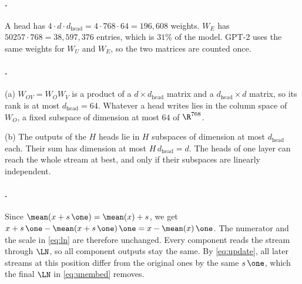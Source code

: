 {\paragraph{.}
A head has $4\cdot d\cdot d_{\mathrm{head}}=4\cdot768\cdot64=196{,}608$ weights. $W_E$ has
$50257\cdot768=38{,}597{,}376$ entries, which is $31\%$ of the model. GPT-2 uses the same weights for $W_U$ and
$W_E$, so the two matrices are counted once.

\paragraph{.}
(a) $W_{OV}=W_OW_V$ is a product of a $d\times d_{\mathrm{head}}$ matrix and a $d_{\mathrm{head}}\times d$ matrix, so its
rank is at most $d_{\mathrm{head}}=64$. Whatever a head writes lies in the column space of $W_O$, a fixed subspace
of dimension at most $64$ of $\R^{768}$.

(b) The outputs of the $H$ heads lie in $H$ subspaces of dimension at most $d_{\mathrm{head}}$ each. Their sum has
dimension at most $H\,d_{\mathrm{head}}=d$. The heads of one layer can reach the whole stream at best, and only if
their subspaces are linearly independent.

\paragraph{.}
Since $\mean(x+s\,\one)=\mean(x)+s$, we get $x+s\,\one-\mean(x+s\,\one)\,\one=x-\mean(x)\,\one$. The numerator and
the scale in \eqref{eq:ln} are therefore unchanged. Every component reads the stream through $\LN$, so all
component outputs stay the same. By \eqref{eq:update}, all later streams at this position differ from the original
ones by the same $s\,\one$, which the final $\LN$ in \eqref{eq:unembed} removes.

}
